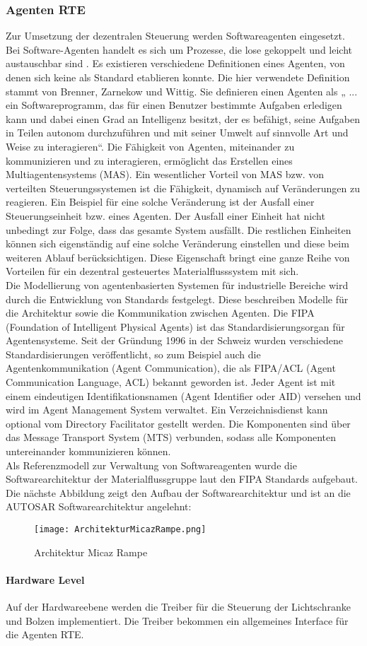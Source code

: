 \subsubsection{Agenten RTE}

Zur Umsetzung der dezentralen Steuerung werden Softwareagenten eingesetzt. Bei Software-Agenten handelt es sich um Prozesse, die lose gekoppelt 
und leicht austauschbar sind \cite[vgl.][S. 31-37]{GH:2010}. Es existieren verschiedene Definitionen eines Agenten, von denen
sich keine als Standard etablieren konnte. Die hier verwendete Definition stammt von
Brenner, Zarnekow und Wittig. Sie definieren einen Agenten als „ ... ein Softwareprogramm,
das für einen Benutzer bestimmte Aufgaben erledigen kann und dabei einen Grad an
Intelligenz besitzt, der es befähigt, seine Aufgaben in Teilen autonom durchzuführen und mit
seiner Umwelt auf sinnvolle Art und Weise zu interagieren“\cite{BZW:1998}. Die Fähigkeit von Agenten, miteinander zu kommunizieren 
und zu interagieren, ermöglicht das Erstellen eines Multiagentensystems (MAS). Ein wesentlicher Vorteil von MAS 
bzw. von verteilten Steuerungssystemen ist die Fähigkeit, dynamisch auf Veränderungen zu reagieren. Ein Beispiel für eine solche Veränderung ist der
Ausfall einer Steuerungseinheit bzw. eines Agenten. Der Ausfall einer Einheit hat nicht unbedingt zur Folge, dass das gesamte System ausfällt. 
Die restlichen Einheiten können sich eigenständig auf eine solche Veränderung einstellen und diese beim weiteren Ablauf
berücksichtigen\cite[S. 13]{Roidl:2012}. Diese Eigenschaft bringt eine ganze Reihe von Vorteilen für ein dezentral
gesteuertes Materialflusssystem mit sich.\\
Die Modellierung von agentenbasierten Systemen für industrielle Bereiche wird durch die
Entwicklung von Standards festgelegt. Diese beschreiben Modelle für die Architektur
sowie die Kommunikation zwischen Agenten. Die FIPA (Foundation of Intelligent Physical Agents) ist das Standardisierungsorgan für Agentensysteme.
Seit der Gründung 1996 in der Schweiz wurden verschiedene Standardisierungen veröffentlicht, so zum Beispiel auch die Agentenkommunikation (Agent Communication), die als FIPA/ACL (Agent Communication Language, ACL) bekannt geworden ist. Jeder Agent ist mit einem eindeutigen
Identifikationsnamen (Agent Identifier oder AID) versehen und wird im Agent Management System verwaltet\cite[S. 24]{Roidl:2012}.
Ein Verzeichnisdienst kann optional vom Directory Facilitator gestellt
werden. Die Komponenten sind über das Message Transport System (MTS) verbunden,
sodass alle Komponenten untereinander kommunizieren können\cite[S. 24]{Roidl:2012}. \\
Als Referenzmodell zur Verwaltung von Softwareagenten wurde die Softwarearchitektur der Materialflussgruppe laut den FIPA Standards aufgebaut. 
Die nächste Abbildung zeigt den Aufbau der Softwarearchitektur und ist an die AUTOSAR Softwarearchitektur angelehnt:
\begin{figure}[h!]
	\centering
		\texttt{[image: ArchitekturMicazRampe.png]}
	\caption{Architektur Micaz Rampe\cite{Stasch:Hahn}}
	\label{ArchitekturMicazRampe}
\end{figure}
\paragraph{Hardware Level}
Auf der Hardwareebene werden die Treiber für die Steuerung der Lichtschranke und Bolzen implementiert. Die Treiber bekommen ein
allgemeines Interface für die Agenten RTE.